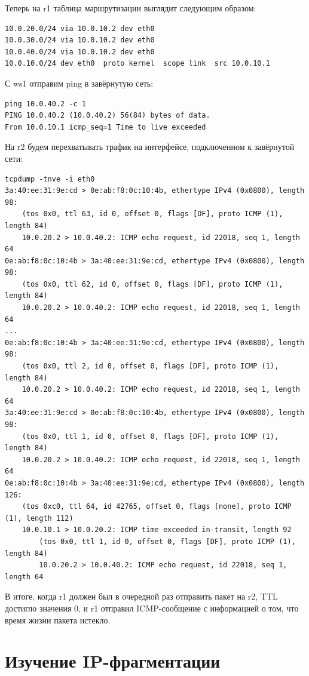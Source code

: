 \documentclass[a4paper,12pt]{article}
\begin{document}
Теперь на r1 таблица маршрутизации выглядит следующим образом:

\begin{Verbatim}
10.0.20.0/24 via 10.0.10.2 dev eth0 
10.0.30.0/24 via 10.0.10.2 dev eth0 
10.0.40.0/24 via 10.0.10.2 dev eth0 
10.0.10.0/24 dev eth0  proto kernel  scope link  src 10.0.10.1
\end{Verbatim}

С ws1 отправим ping в завёрнутую сеть:

\begin{Verbatim}
ping 10.0.40.2 -c 1
PING 10.0.40.2 (10.0.40.2) 56(84) bytes of data.
From 10.0.10.1 icmp_seq=1 Time to live exceeded
\end{Verbatim}

 На r2 будем перехватывать трафик на интерфейсе, подключенном к завёрнутой сети:
\begin{Verbatim}
tcpdump -tnve -i eth0
3a:40:ee:31:9e:cd > 0e:ab:f8:0c:10:4b, ethertype IPv4 (0x0800), length 98: 
    (tos 0x0, ttl 63, id 0, offset 0, flags [DF], proto ICMP (1), length 84) 
    10.0.20.2 > 10.0.40.2: ICMP echo request, id 22018, seq 1, length 64
0e:ab:f8:0c:10:4b > 3a:40:ee:31:9e:cd, ethertype IPv4 (0x0800), length 98: 
    (tos 0x0, ttl 62, id 0, offset 0, flags [DF], proto ICMP (1), length 84) 
    10.0.20.2 > 10.0.40.2: ICMP echo request, id 22018, seq 1, length 64
...
0e:ab:f8:0c:10:4b > 3a:40:ee:31:9e:cd, ethertype IPv4 (0x0800), length 98: 
    (tos 0x0, ttl 2, id 0, offset 0, flags [DF], proto ICMP (1), length 84) 
    10.0.20.2 > 10.0.40.2: ICMP echo request, id 22018, seq 1, length 64
3a:40:ee:31:9e:cd > 0e:ab:f8:0c:10:4b, ethertype IPv4 (0x0800), length 98: 
    (tos 0x0, ttl 1, id 0, offset 0, flags [DF], proto ICMP (1), length 84) 
    10.0.20.2 > 10.0.40.2: ICMP echo request, id 22018, seq 1, length 64
0e:ab:f8:0c:10:4b > 3a:40:ee:31:9e:cd, ethertype IPv4 (0x0800), length 126: 
    (tos 0xc0, ttl 64, id 42765, offset 0, flags [none], proto ICMP (1), length 112) 
    10.0.10.1 > 10.0.20.2: ICMP time exceeded in-transit, length 92
        (tos 0x0, ttl 1, id 0, offset 0, flags [DF], proto ICMP (1), length 84) 
        10.0.20.2 > 10.0.40.2: ICMP echo request, id 22018, seq 1, length 64
\end{Verbatim}

В итоге, когда r1 должен был в очередной раз отправить пакет на r2,  TTL достигло значения 0, и  r1 отправил ICMP-сообщение с информацией о том, что время жизни пакета истекло.

\section{Изучение IP-фрагментации}
\end{document}
